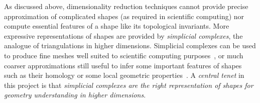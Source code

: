 As discussed above, dimensionality reduction techniques cannot provide precise approximation of complicated shapes (as required in scientific computing) nor compute essential features of a shape like its topological invariants.
More expressive representations of shapes are provided %
by {\em simplicial complexes}, the analogue of triangulations in higher dimensions.
 Simplicial complexes can be used to produce fine meshes well suited to scientific computing purposes~\cite{mh-mpc-2002,boissonnat2010meshing}, or much coarser approximations still useful to infer some important features of shapes such as their homology or some local geometric properties~\cite{geometrica-ccl09,nsw-fhm-2008}. 
 A {\em central tenet} in this project is that {\em simplicial complexes are the right representation of shapes for geometry understanding in higher dimensions}.%


